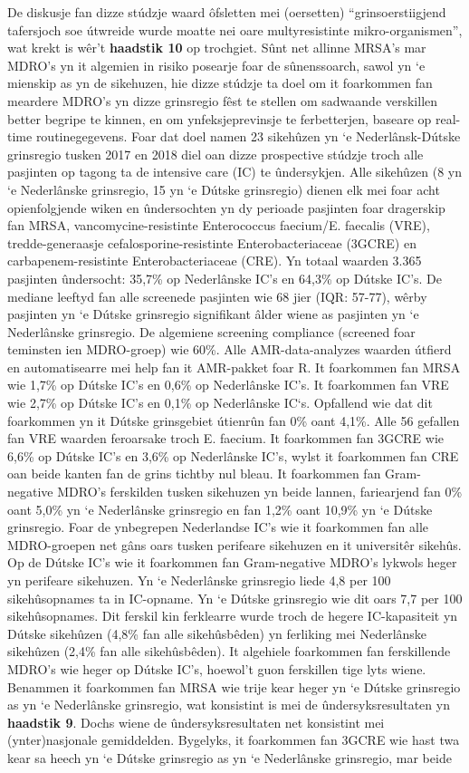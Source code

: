 \documentclass[
]{book}
\begin{document}
De diskusje fan dizze stúdzje waard ôfsletten mei (oersetten) ``grinsoerstiigjend tafersjoch soe útwreide wurde moatte nei oare multyresistinte mikro-organismen'', wat krekt is wêr't \textbf{haadstik 10} op trochgiet. Sûnt net allinne MRSA's mar MDRO's yn it algemien in risiko posearje foar de sûnenssoarch, sawol yn `e mienskip as yn de sikehuzen, hie dizze stúdzje ta doel om it foarkommen fan meardere MDRO's yn dizze grinsregio fêst te stellen om sadwaande verskillen better begripe te kinnen, en om ynfeksjeprevinsje te ferbetterjen, baseare op real-time routinegegevens. Foar dat doel namen 23 sikehûzen yn `e Nederlânsk-Dútske grinsregio tusken 2017 en 2018 diel oan dizze prospective stúdzje troch alle pasjinten op tagong ta de intensive care (IC) te ûndersykjen. Alle sikehûzen (8 yn `e Nederlânske grinsregio, 15 yn `e Dútske grinsregio) dienen elk mei foar acht opienfolgjende wiken en ûndersochten yn dy perioade pasjinten foar dragerskip fan MRSA, vancomycine-resistinte Enterococcus faecium/E. faecalis (VRE), tredde-generaasje cefalosporine-resistinte Enterobacteriaceae (3GCRE) en carbapenem-resistinte Enterobacteriaceae (CRE). Yn totaal waarden 3.365 pasjinten ûndersocht: 35,7\% op Nederlânske IC's en 64,3\% op Dútske IC's. De mediane leeftyd fan alle screenede pasjinten wie 68 jier (IQR: 57-77), wêrby pasjinten yn `e Dútske grinsregio signifikant âlder wiene as pasjinten yn `e Nederlânske grinsregio. De algemiene screening compliance (screened foar teminsten ien MDRO-groep) wie 60\%. Alle AMR-data-analyzes waarden útfierd en automatisearre mei help fan it AMR-pakket foar R. It foarkommen fan MRSA wie 1,7\% op Dútske IC's en 0,6\% op Nederlânske IC's. It foarkommen fan VRE wie 2,7\% op Dútske IC's en 0,1\% op Nederlânske IC`s. Opfallend wie dat dit foarkommen yn it Dútske grinsgebiet útienrûn fan 0\% oant 4,1\%. Alle 56 gefallen fan VRE waarden feroarsake troch E. faecium. It foarkommen fan 3GCRE wie 6,6\% op Dútske IC's en 3,6\% op Nederlânske IC's, wylst it foarkommen fan CRE oan beide kanten fan de grins tichtby nul bleau. It foarkommen fan Gram-negative MDRO's ferskilden tusken sikehuzen yn beide lannen, fariearjend fan 0\% oant 5,0\% yn `e Nederlânske grinsregio en fan 1,2\% oant 10,9\% yn `e Dútske grinsregio. Foar de ynbegrepen Nederlandse IC's wie it foarkommen fan alle MDRO-groepen net gâns oars tusken perifeare sikehuzen en it universitêr sikehûs. Op de Dútske IC's wie it foarkommen fan Gram-negative MDRO's lykwols heger yn perifeare sikehuzen. Yn `e Nederlânske grinsregio liede 4,8 per 100 sikehûsopnames ta in IC-opname. Yn `e Dútske grinsregio wie dit oars 7,7 per 100 sikehûsopnames. Dit ferskil kin ferklearre wurde troch de hegere IC-kapasiteit yn Dútske sikehûzen (4,8\% fan alle sikehûsbêden) yn ferliking mei Nederlânske sikehûzen (2,4\% fan alle sikehûsbêden). It algehiele foarkommen fan ferskillende MDRO's wie heger op Dútske IC's, hoewol't guon ferskillen tige lyts wiene. Benammen it foarkommen fan MRSA wie trije kear heger yn `e Dútske grinsregio as yn `e Nederlânske grinsregio, wat konsistint is mei de ûndersyksresultaten yn \textbf{haadstik 9}. Dochs wiene de ûndersyksresultaten net konsistint mei (ynter)nasjonale gemiddelden. Bygelyks, it foarkommen fan 3GCRE wie hast twa kear sa heech yn `e Dútske grinsregio as yn `e Nederlânske grinsregio, mar beide 
\end{document}
